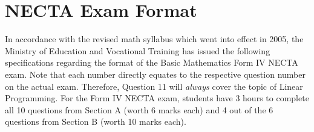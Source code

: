 \chapter{NECTA Exam Format}
\label{cha:nectaformat}

In accordance with the revised math syllabus which went into effect in 2005, the Ministry of Education and Vocational Training has issued the following specifications regarding the format of the Basic Mathematics Form IV NECTA exam. Note that each number directly equates to the respective question number on the actual exam. Therefore, Question 11 will \emph{always} cover the topic of Linear Programming. For the Form IV NECTA exam, students have 3 hours to complete all 10 questions from Section A (worth 6 marks each) and 4 out of the 6 questions from Section B (worth 10 marks each).

